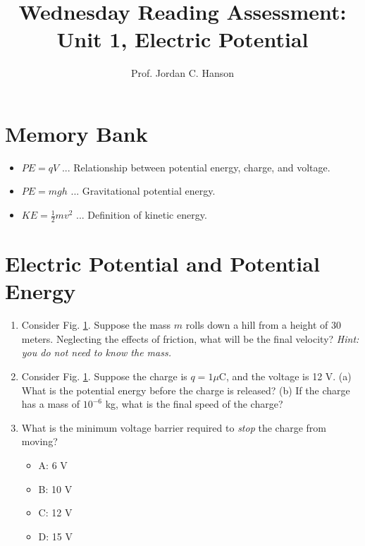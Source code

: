 \documentclass{article}
\begin{document}
\title{Wednesday Reading Assessment: Unit 1, Electric Potential}
\author{Prof. Jordan C. Hanson}

\maketitle

\section{Memory Bank}

\begin{itemize}
\item $PE = q V$ ... Relationship between potential energy, charge, and voltage.
\item $PE = m g h$ ... Gravitational potential energy.
\item $KE = \frac{1}{2}m v^2$ ... Definition of kinetic energy.
\end{itemize}

\section{Electric Potential and Potential Energy}

\begin{enumerate}
\begin{figure}[ht]
\centering
\texttt{[image: hill2.png]}
\caption{\label{fig:hill} The relationship between potential energy and voltage.}
\end{figure}
\item Consider Fig. \ref{fig:hill}.  Suppose the mass $m$ rolls down a hill from a height of 30 meters.  Neglecting the effects of friction, what will be the final velocity?  \textit{Hint: you do not need to know the mass.} \\ \vspace{1cm}
\item Consider Fig. \ref{fig:hill}.  Suppose the charge is $q = 1 \mu$C, and the voltage is 12 V.  (a) What is the potential energy before the charge is released? (b) If the charge has a mass of $10^{-6}$ kg, what is the final speed of the charge? \\ \vspace{1.5cm}
\item What is the minimum voltage barrier required to \textit{stop} the charge from moving?
\begin{itemize}
\item A: 6 V
\item B: 10 V
\item C: 12 V
\item D: 15 V
\end{itemize}
\end{enumerate}
\end{document}

